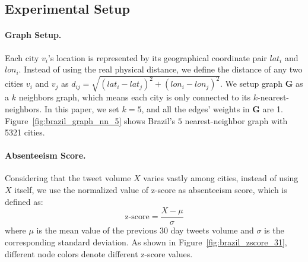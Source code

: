 


\subsection{Experimental Setup}
\label{sec:experimental_setup}

\paragraph{Graph Setup.}
Each city $v_i$'s location is represented by its geographical coordinate pair $lat_i$ and $lon_i$. Instead of using the real physical distance, we define the distance of any two cities $v_i$ and $v_j$ as $d_{ij}=\sqrt{(lat_i-lat_j)^2+(lon_i-lon_j)^2}$. We setup graph $\mathbf{G}$ as a $k$ neighbors graph, which means  each city is only  connected to its $k$-nearest-neighbors. In this paper, we set $k=5$, and all the edges' weights  in $\mathbf{G}$ are 1. Figure~\ref{fig:brazil_graph_nn_5} shows Brazil's $5$ nearest-neighbor graph with 5321 cities.



\paragraph{Absenteeism Score.}
Considering that
the tweet volume $X$ varies vastly among cities, instead of using $X$ itself, we use the normalized value of z-score as absenteeism score, which is defined as:
\begin{equation}
\label{eq:Z_score}
\textrm{z-score} = \frac{X-\mu}{\sigma}
\end{equation}where $\mu$ is the mean value of the previous $30$ day tweets volume and $\sigma$ is the corresponding standard deviation. As shown in Figure~\ref{fig:brazil_zscore_31}, different
node colors denote different z-score values.


